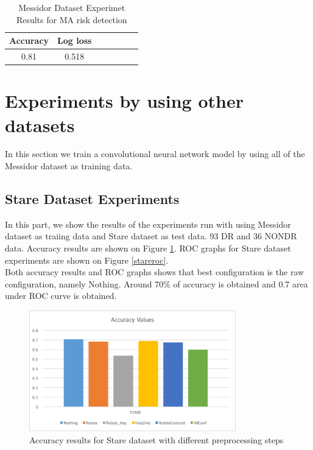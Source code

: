 \begin{table}[t]
\centering
\caption{Messidor Dataset Experimet Results for MA risk detection} \label{tab:msdma}
\begin{tabular}{|c|c|c|c|c|c|c|} \hline
 Accuracy & Log loss \\ \hline
 0.81 & 0.518\\ \hline
\end{tabular}
\end{table}

\section{Experiments by using other datasets}
In this section we train a convolutional neural network model by using all of the Messidor dataset as training data. 
\subsection{Stare Dataset Experiments}
In this part, we show the results of the experiments run with using Messidor dataset as traiing data and Stare dataset as test data. 93 DR and 36 NONDR data. Accuracy results are shown on Figure \ref{stareacc}. ROC graphs for Stare dataset experiments are shown on Figure \ref{stareroc}.\\
Both accuracy results and ROC graphs shows that best configuration is the raw configuration, namely Nothing. Around 70\% of accuracy is obtained and 0.7 area under ROC curve is obtained.   

\begin{figure}[!htbbp]
\centering
\includegraphics[width=0.8\textwidth]{Figures/stareacc.png}
\caption{Accuracy results for Stare dataset with different preprocessing steps}
\label{stareacc}
\end{figure}

